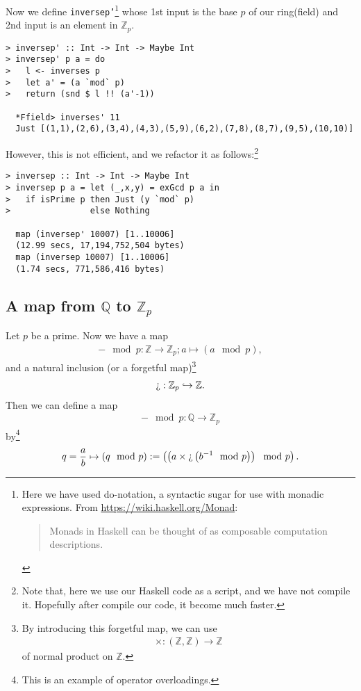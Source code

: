 \documentclass[11pt]{book}
\begin{document}
Now we define \texttt{inversep'}\footnote{
Here we have used do-notation, a syntactic sugar for use with monadic expressions.
From \url{https://wiki.haskell.org/Monad}:
\begin{quotation}
Monads in Haskell can be thought of as composable computation descriptions.
\end{quotation}
} whose 1st input is the base $p$ of our ring(field) and 2nd input is an element in $\mathbb{Z}_p$.
\begin{verbatim}
> inversep' :: Int -> Int -> Maybe Int
> inversep' p a = do
>   l <- inverses p
>   let a' = (a `mod` p)
>   return (snd $ l !! (a'-1)) 
   
  *Ffield> inverses' 11
  Just [(1,1),(2,6),(3,4),(4,3),(5,9),(6,2),(7,8),(8,7),(9,5),(10,10)]
\end{verbatim}
However, this is not efficient, and we refactor it as follows:\footnote{
Note that, here we use our Haskell code as a script, and we have not compile it.
Hopefully after compile our code, it become much faster.
}
\begin{verbatim}
> inversep :: Int -> Int -> Maybe Int
> inversep p a = let (_,x,y) = exGcd p a in
>   if isPrime p then Just (y `mod` p)
>                else Nothing

  map (inversep' 10007) [1..10006]
  (12.99 secs, 17,194,752,504 bytes)
  map (inversep 10007) [1..10006]
  (1.74 secs, 771,586,416 bytes)
\end{verbatim}


\subsection{A map from $\mathbb{Q}$ to $\mathbb{Z}_p$}
Let $p$ be a prime.
Now we have a map
\begin{eqnarray}
- \mod p : \mathbb{Z} \to \mathbb{Z}_p; a \mapsto (a \mod p),
\end{eqnarray}
and a natural inclusion (or a forgetful map)\footnote{
By introducing this forgetful map, we can use 
\begin{eqnarray}
\times : (\mathbb{Z}, \mathbb{Z}) \to \mathbb{Z} 
\end{eqnarray}
of normal product on $\mathbb{Z}$.
}
\begin{eqnarray}
\text{\textquestiondown} : \mathbb{Z}_p \hookrightarrow \mathbb{Z}.
\end{eqnarray}
Then we can define a map
\begin{eqnarray}
- \mod p : \mathbb{Q} \to \mathbb{Z}_p
\end{eqnarray}
by\footnote{
This is an example of operator overloadings.
}
\begin{eqnarray}
q = \frac{a}{b} \mapsto (q \mod p) := \left( \left( a \times \text{\textquestiondown} \left( b^{-1} \mod p\right) \right) \mod p \right).
\end{eqnarray}
\end{document}
